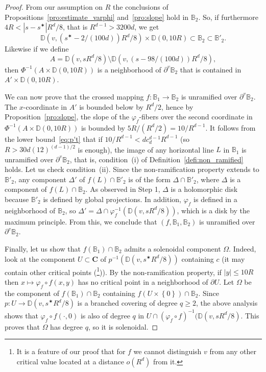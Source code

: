 \documentclass[oneside, 12pt]{amsart}
\newcommand{\disk}{\mathbb{D}}
\newcommand{\fr}{\partial}
\newcommand{\set}[1]{\left\{#1\right\}}
\newcommand{\abs}[1]{\left\vert#1\right\vert}
\newcommand{\inv}{^{-1}}
\newcommand{\C}{\mathbf{C}}
\newcommand{\bb}{\mathbb{B}}
\theoremstyle{plain}
\theoremstyle{definition}
\numberwithin{equation}{section}       %
\numberwithin{equation}{section}       %
\begin{document}
\begin{proof}
From  our assumption on $R$ the conclusions of Propositions~\ref{pro:estimate_varphi} and~\ref{pro:slope} hold in $\bb_2$. 
So, if furthermore  $4R<\abs{s - s^\varstar} R^d/8$, that is $R^{d-1}>3200d$, we get 
\begin{equation} 
\disk(v,  (s^\varstar - 2/(100d)) R^d/8)\times \disk(0, 10 R)\subset \bb_2\subset \bb'_2.
 \end{equation}
  Likewise if we define
 \begin{equation}
 A =  \disk(v,  s  R^d/8)\setminus \disk(v,  (s - 98/(100d)) R^d/8),
 \end{equation} 
 then  $\Phi\inv (A\times \disk(0, 10 R))$ is a neighborhood of $\fr^v\bb_2$ that is contained  in $A'\times \disk(0, 10 R)$. 

We can now prove that the crossed mapping $f\colon \bb_1 \to \bb_2$ is unramified
over $\fr^v\bb_2$.
The $x$-coordinate in $A'$ is bounded below by $R^d/2$, hence 
 by Proposition~\ref{pro:slope},
  the slope of the $\varphi_f$-fibers over the second coordinate in  $\Phi\inv (A\times \disk(0, 10 R))$
  is bounded by $5R/(R^d/2) = 10 /R^{d-1}$. 
  It follows from  the lower bound~\eqref{eq:p't}   that 
  if $10/R^{d-1}< d c_d^{d-1} R^{d-1}$  (so $R> 30 d (12)^{(d-1)/2}$ is
  enough), 
the image of any horizontal line $L$ in $\bb_1$ is unramified over $\fr^v\bb_2$, 
  that is, condition~(i) of Definition~\ref{defi:non_ramified} holds. 
   Let us check condition~(ii). Since the non-ramification property extends to $\bb'_2$, 
   any component $\Delta'$ of $f(L)\cap \bb'_2$ is of the form $\Delta\cap \bb'_2$, 
   where $\Delta$ is a component of $f(L)\cap \bb_2$. As observed in Step 1, $\Delta$ is a holomorphic disk  
 because $\bb'_2$ is defined by global projections. 
 In addition, $\varphi_f$ is defined in a neighborhood of $\bb_2$, so  $\Delta'= \Delta\cap \varphi_f\inv(\disk(v, sR^d/8))$, which is a disk by the maximum principle. From this, we conclude that $(f,\bb_1, \bb_2)$ is unramified over $\fr^v\bb_2$. 
 
 
 
 
Finally,  let us  show that  $f(\bb_1)\cap \bb_2$ admits a solenoidal 
component $\Omega$. Indeed,   look at the 
component $U\subset \C$ of 
$p\inv(\disk(v,s^\varstar R^d/8))$ containing $c$ 
(it may contain other critical points (\footnote{It is a feature of our proof that for $f$ we cannot distinguish $v$ from any other critical value located at a distance $o(R^d)$ from it.})).
 By the non-ramification property, if $\abs{y}\leq 10R$ then
 $x\mapsto \varphi_f\circ f (x, y)$ has no critical point in a neighborhood of $\fr U$. 
Let $\Omega$ be the component of $f(\bb_1)\cap \bb_2$ containing 
$f(U\times \set{0})\cap \bb_2$. 
Since  $p: U\to \disk(v,s^\varstar R^d/8)$ is a branched covering of degree $q\geq 2$, 
the above analysis shows that 
  $\varphi_f\circ f (\cdot, 0)$  is also
 of degree $q$ in  $U\cap (\varphi_f\circ f)\inv(\disk(v,s R^d/8)$.  
This proves that 
$\Omega$ has degree $q$, so it is solenoidal. 
 \end{proof}
\end{document}
